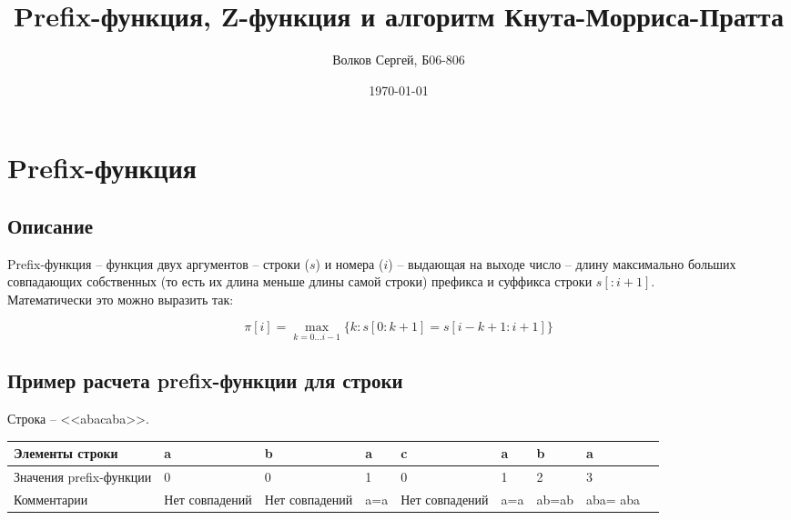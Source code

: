 \documentclass[a4paper,12pt]{article} %
\author{Волков Сергей, Б06-806}
\title{Prefix-функция, Z-функция и алгоритм Кнута-Морриса-Пратта}
\date{\today}
\begin{document}

\maketitle

\tableofcontents

\newpage

\section{Prefix-функция}

\subsection{Описание}

Prefix-функция – функция двух аргументов – строки ($s$) и номера ($i$) – выдающая на выходе число – длину максимально больших совпадающих собственных (то есть их длина меньше длины самой строки) префикса и суффикса строки $s[ : i+1]$.\\

Математически это можно выразить так:

\begin{equation}
\pi[i] = \max_{k = 0 \dots i-1} { \lbrace k : s[0 : k+1] = s[i-k+1 : i+1] \rbrace }
\end{equation}

\subsection{Пример расчета prefix-функции для строки}

Строка – <<abacaba>>.\\

\begin{table}[h!]

\begin{tabular}{|p{2.5cm}||p{1.3cm}|p{1.3cm}|p{1.3cm}|p{1.3cm}|p{1.3cm}|p{1.3cm}|p{1.3cm}|p{2.5cm}|}

\hline 
Элементы строки & a & b & a & c & a & b & a \\ 
\hline 
Значения prefix-функции & 0 & 0 & 1 & 0 & 1 & 2 & 3 \\ 
\hline 
Комментарии & Нет совпадений & Нет совпадений & a=a & Нет совпадений & a=a & ab=ab & aba= aba \\ 
\hline 
\end{tabular} 

\end{table}
\end{document}
